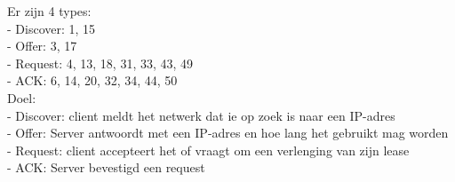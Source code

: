 Er zijn 4 types:\\
- Discover: 1, 15\\
- Offer: 3, 17\\
- Request: 4, 13, 18, 31, 33, 43, 49\\
- ACK: 6, 14, 20, 32, 34, 44, 50\\

Doel:\\
- Discover: client meldt het netwerk dat ie op zoek is naar een IP-adres\\
- Offer: Server antwoordt met een IP-adres en hoe lang het gebruikt mag worden\\
- Request: client accepteert het of vraagt om een verlenging van zijn lease\\
- ACK: Server bevestigd een request